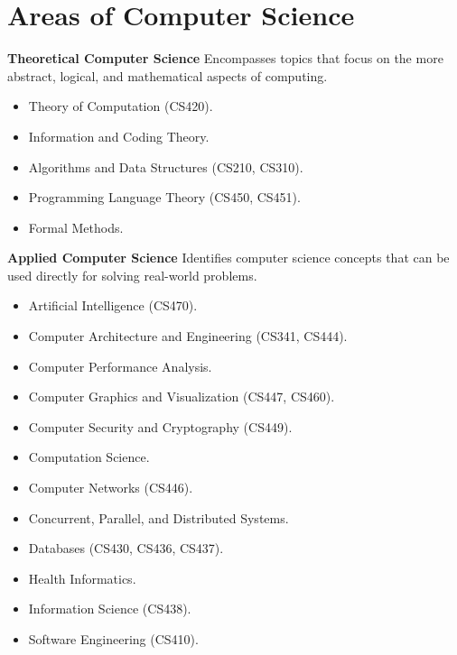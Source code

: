 \documentclass[8pt,a4paper,compress]{beamer}
\begin{document}
\section{Areas of Computer Science}
\begin{frame}[fragile]
\pause
\textbf{Theoretical Computer Science} Encompasses topics that focus on the more abstract, logical, and mathematical aspects of computing.
\begin{itemize}
\item Theory of Computation (CS420). 
\item Information and Coding Theory. 
\item Algorithms and Data Structures (CS210, CS310).
\item Programming Language Theory (CS450, CS451).
\item Formal Methods.
\end{itemize}

\pause
\textbf{Applied Computer Science} Identifies computer science concepts that can be used directly for solving real-world problems.
\begin{itemize}
\item Artificial Intelligence (CS470).
\item Computer Architecture and Engineering (CS341, CS444).
\item Computer Performance Analysis.
\item Computer Graphics and Visualization (CS447, CS460).
\item Computer Security and Cryptography (CS449).
\item Computation Science.
\item Computer Networks (CS446).
\item Concurrent, Parallel, and Distributed Systems.
\item Databases (CS430, CS436, CS437).
\item Health Informatics.
\item Information Science (CS438).
\item Software Engineering (CS410).
\end{itemize}
\end{frame}
\end{document}
